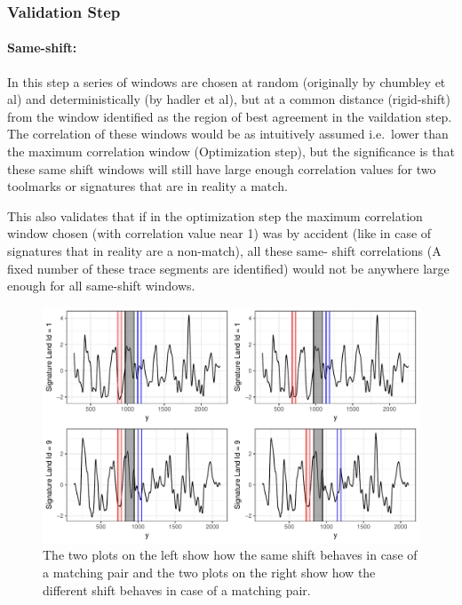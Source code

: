 \documentclass[12pt]{article}
\begin{document}
\subsubsection{Validation Step}\label{validation-step}

\paragraph{Same-shift:}\label{same-shift}

In this step a series of windows are chosen at random (originally by
chumbley et al) and deterministically (by hadler et al), but at a common
distance (rigid-shift) from the window identified as the region of best
agreement in the vaildation step. The correlation of these windows would
be as intuitively assumed i.e.~lower than the maximum correlation window
(Optimization step), but the significance is that these same shift
windows will still have large enough correlation values for two
toolmarks or signatures that are in reality a match.

This also validates that if in the optimization step the maximum
correlation window chosen (with correlation value near 1) was by
accident (like in case of signatures that in reality are a non-match),
all these same- shift correlations (A fixed number of these trace
segments are identified) would not be anywhere large enough for all
same-shift windows.

\begin{figure}

{\centering \includegraphics[width=\textwidth]{figures/win-comparison-1} 

}

\caption{ The two plots on the left show how the same shift behaves in case of a matching pair and the two plots on the right show how the different shift behaves in case of a matching pair.}\label{fig:win-comparison}
\end{figure}
\end{document}
